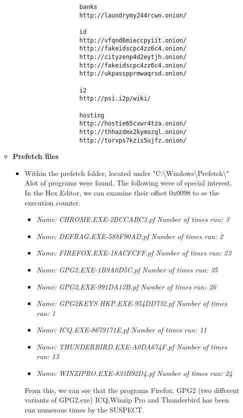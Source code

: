 \begin{enumerate}
\begin{itemize}
\begin{itemize}
\begin{itemize}
\begin{verbatim}
			banks
			http://laundrymy244rcwn.onion/
			
			id
			http://vfqnd6mieccpyiit.onion/
			http://fakeidscpc4zz6c4.onion/
			http://cityzenp4d2eytjh.onion/
			http://fakeidscpc4zz6c4.onion/
			http://ukpasspprmwaqrsd.onion/
			
			i2
			http://psi.i2p/wiki/
			
			hosting
			http://hostie65cxwr4tza.onion/
			http://thhazdmx2kymozql.onion/
			http://torvps7kzis5ujfz.onion/
			\end{verbatim}
		\end{itemize}
		
		
	\end{itemize}
	
	\newpage
	\item{\textbf{Prefetch files}}
	\begin{itemize}
			\item Within the prefetch folder, located under "C:\textbackslash Windows\textbackslash Prefetch\textbackslash" Alot of programs were found. The following were of special interest. In the Hex Editor, we can examine their offset 0x0098 to se the execution counter.
			
			\begin{itemize}
				\item \textit{Name: CHROME.EXE-2BCCABC3.pf}   \textit{Number of times run: 3}		
				\item \textit{Name: DEFRAG.EXE-588F90AD.pf}   \textit{Number of times run: 2}
				\item \textit{Name: FIREFOX.EXE-18ACFCFF.pf}   \textit{Number of times run: 23}
				\item \textit{Name: GPG2.EXE-1B9A0D5C.pf}   \textit{Number of times run: 35}
				\item \textit{Name: GPG2.EXE-991DA12B.pf}  	\textit{Number of times run: 26}
				\item \textit{Name: GPG2KEYS \textunderscore HKP.EXE-954DD732.pf}   \textit{Number of times run: 1}
				\item \textit{Name: ICQ.EXE-8679171E.pf}   	\textit{Number of times run: 11}
				\item \textit{Name: THUNDERBIRD.EXE-A0DA674F.pf}   \textit{Number of times run: 13}
				\item \textit{Name: WINZIPRO.EXE-833B92D4.pf}  	\textit{Number of times run: 24}
				
			\end{itemize}
			
			From this, we can see that the programs Firefox, GPG2 (two different variants of GPG2.exe) ICQ,Winzip Pro and Thunderbird has been run numerous times by the SUSPECT.
			

\end{itemize}
\end{itemize}
\end{enumerate}

